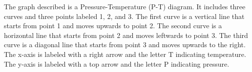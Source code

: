 The graph described is a Pressure-Temperature (P-T) diagram. It includes three curves and three points labeled 1, 2, and 3. The first curve is a vertical line that starts from point 1 and moves upwards to point 2. The second curve is a horizontal line that starts from point 2 and moves leftwards to point 3. The third curve is a diagonal line that starts from point 3 and moves upwards to the right. The x-axis is labeled with a right arrow and the letter T indicating temperature. The y-axis is labeled with a top arrow and the letter P indicating pressure.